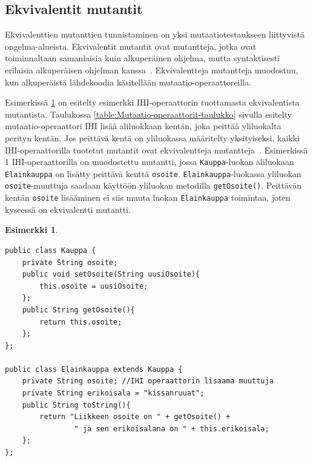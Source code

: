 \documentclass[finnish, grading]{tktltiki2}
\theoremstyle{definition}
\newtheorem{esim}[lau]{Esimerkki}
\theoremstyle{remark}
\begin{document}

\subsection{Ekvivalentit mutantit}

Ekvivalenttien mutanttien tunnistaminen on yksi mutaatiotestaukseen liittyvistä ongelma-alueista. Ekvivalentit mutantit ovat mutantteja, jotka ovat toiminnaltaan samanlaisia kuin alkuperäinen ohjelma, mutta syntaktisesti erilaisia alkuperäisen ohjelman kanssa~\cite[s. 652]{Jia:Harman:2011}. Ekvivalentteja mutantteja muodostuu, kun alkuperäistä lähdekoodia käsitellään mutaatio-operaattoreilla. 

Esimerkissä \ref{esim:IHIEkvivalenttiMutantti} on esitelty esimerkki IHI-operaattorin tuottamasta ekvivalentista mutantista. Taulukossa \ref{table:Mutaatio-operaattorit-taulukko} sivulla \pageref{table:Mutaatio-operaattorit-taulukko} esitelty mutaatio-operaattori IHI lisää aliluokkaan kentän, joka peittää yliluokalta perityn kentän. Jos peittävä kentä on yliluokassa määritelty yksityiseksi, kaikki IHI-operaattorilla tuotetut mutantit ovat ekvivalentteja mutantteja~\cite[s. 80]{Offutt:Ma:Kwon:2006:MuClassLevel}. Esimerkissä 1 IHI-operaattorilla on muodostettu mutantti, jossa \texttt{Kauppa}-luokan aliluokaan \texttt{Elainkauppa} on lisätty peittävä kenttä \texttt{osoite}. \texttt{Elainkauppa}-luokassa yliluokan \texttt{osoite}-muuttuja saadaan käyttöön yliluokan metodilla \texttt{getOsoite()}. Peittävän kentän \texttt{osoite} lisääminen ei siis muuta luokan \texttt{Elainkauppa} toimintaa, joten kyseessä on ekvivalentti mutantti. 

\begin{esim}
\vspace{1\baselineskip}\noindent
\begin{lstlisting} 
public class Kauppa {
	private String osoite;
	public void setOsoite(String uusiOsoite){
		this.osoite = uusiOsoite;
	};
	public String getOsoite(){
		return this.osoite;
	};
};

public class Elainkauppa extends Kauppa {
	private String osoite; //IHI operaattorin lisaama muuttuja
	private String erikoisala = "kissanruuat";
	public String toString(){
		return "Liikkeen osoite on " + getOsoite() +
		        " ja sen erikoisalana on " + this.erikoisala;
	};
};
\end{lstlisting}
\label{esim:IHIEkvivalenttiMutantti}
\end{esim}
\end{document}
